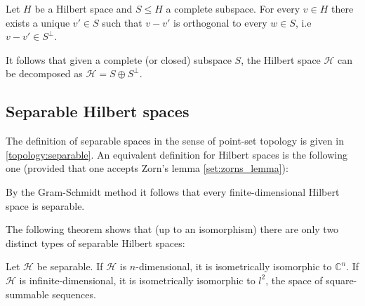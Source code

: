    \begin{theorem}\label{functional:projection_theorem}
        Let $H$ be a Hilbert space and $S\leq H$ a complete subspace. For every $v\in H$ there exists a unique $v'\in S$ such that $v-v'$ is orthogonal to every $w\in S$, i.e $v-v'\in S^\perp$.
    \end{theorem}
    \begin{result}
        It follows that given a complete (or closed) subspace $S$, the Hilbert space $\mathcal{H}$ can be decomposed as $\mathcal{H} = S\oplus S^\perp$.
    \end{result}


\subsection{Separable Hilbert spaces}

    The definition of separable spaces in the sense of point-set topology is given in \ref{topology:separable}. An equivalent definition for Hilbert spaces is the following one (provided that one accepts Zorn's lemma \ref{set:zorns_lemma}):
    \begin{example}
        By the Gram-Schmidt method it follows that every finite-dimensional Hilbert space is separable.
    \end{example}

    The following theorem shows that (up to an isomorphism) there are only two distinct types of separable Hilbert spaces:
    \begin{theorem}
        Let $\mathcal{H}$ be separable. If $\mathcal{H}$ is $n$-dimensional, it is isometrically isomorphic to $\mathbb{C}^n$. If $\mathcal{H}$ is infinite-dimensional, it is isometrically isomorphic to $l^2$, the space of square-summable sequences.
    \end{theorem}

